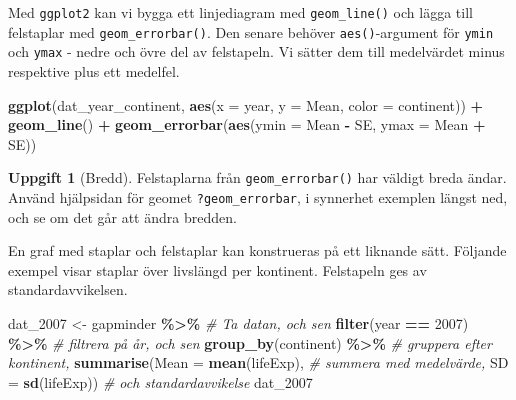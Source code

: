 \documentclass[
]{book}
\newenvironment{Shaded}{\begin{snugshade}}{\end{snugshade}}
\newcommand{\AttributeTok}[1]{\textcolor[rgb]{0.13,0.29,0.53}{#1}}
\newcommand{\CommentTok}[1]{\textcolor[rgb]{0.56,0.35,0.01}{\textit{#1}}}
\newcommand{\DecValTok}[1]{\textcolor[rgb]{0.00,0.00,0.81}{#1}}
\newcommand{\FunctionTok}[1]{\textcolor[rgb]{0.13,0.29,0.53}{\textbf{#1}}}
\newcommand{\NormalTok}[1]{#1}
\newcommand{\OtherTok}[1]{\textcolor[rgb]{0.56,0.35,0.01}{#1}}
\newcommand{\SpecialCharTok}[1]{\textcolor[rgb]{0.81,0.36,0.00}{\textbf{#1}}}
\theoremstyle{definition}
\theoremstyle{definition}
\theoremstyle{definition}
\newtheorem{exercise}{Uppgift}[chapter]
\theoremstyle{definition}
\theoremstyle{remark}
\begin{document}
Med \texttt{ggplot2} kan vi bygga ett linjediagram med \texttt{geom\_line()} och lägga till felstaplar med \texttt{geom\_errorbar()}. Den senare behöver \texttt{aes()}-argument för \texttt{ymin} och \texttt{ymax} - nedre och övre del av felstapeln. Vi sätter dem till medelvärdet minus respektive plus ett medelfel.

\begin{Shaded}
\begin{Highlighting}[]
\FunctionTok{ggplot}\NormalTok{(dat\_year\_continent, }\FunctionTok{aes}\NormalTok{(}\AttributeTok{x =}\NormalTok{ year, }\AttributeTok{y =}\NormalTok{ Mean, }
                               \AttributeTok{color =}\NormalTok{ continent)) }\SpecialCharTok{+}
  \FunctionTok{geom\_line}\NormalTok{() }\SpecialCharTok{+}
  \FunctionTok{geom\_errorbar}\NormalTok{(}\FunctionTok{aes}\NormalTok{(}\AttributeTok{ymin =}\NormalTok{ Mean }\SpecialCharTok{{-}}\NormalTok{ SE, }\AttributeTok{ymax =}\NormalTok{ Mean }\SpecialCharTok{+}\NormalTok{ SE))}
\end{Highlighting}
\end{Shaded}

\begin{exercise}[Bredd]
Felstaplarna från \texttt{geom\_errorbar()} har väldigt breda ändar. Använd hjälpsidan för geomet \texttt{?geom\_errorbar}, i synnerhet exemplen längst ned, och se om det går att ändra bredden.
\end{exercise}

En graf med staplar och felstaplar kan konstrueras på ett liknande sätt. Följande exempel visar staplar över livslängd per kontinent. Felstapeln ges av standardavvikelsen.

\begin{Shaded}
\begin{Highlighting}[]
\NormalTok{dat\_2007 }\OtherTok{\textless{}{-}}\NormalTok{ gapminder }\SpecialCharTok{\%\textgreater{}\%}          \CommentTok{\# Ta datan, och sen}
  \FunctionTok{filter}\NormalTok{(year }\SpecialCharTok{==} \DecValTok{2007}\NormalTok{) }\SpecialCharTok{\%\textgreater{}\%}        \CommentTok{\# filtrera på år, och sen}
  \FunctionTok{group\_by}\NormalTok{(continent) }\SpecialCharTok{\%\textgreater{}\%}         \CommentTok{\# gruppera efter kontinent,}
  \FunctionTok{summarise}\NormalTok{(}\AttributeTok{Mean =} \FunctionTok{mean}\NormalTok{(lifeExp), }\CommentTok{\# summera med medelvärde,}
            \AttributeTok{SD =} \FunctionTok{sd}\NormalTok{(lifeExp))     }\CommentTok{\# och standardavvikelse}
\NormalTok{dat\_2007}
\end{Highlighting}
\end{Shaded}
\end{document}
